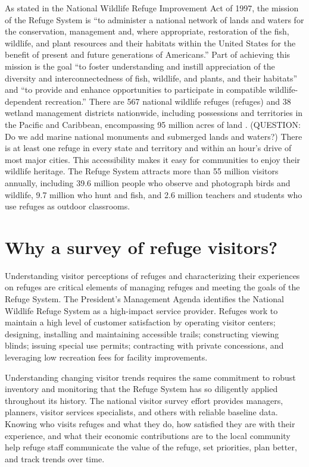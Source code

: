 \documentclass[]{book}
\begin{document}
As stated in the National Wildlife Refuge Improvement Act of 1997, the
mission of the Refuge System is ``to administer a national network of
lands and waters for the conservation, management and, where
appropriate, restoration of the fish, wildlife, and plant resources and
their habitats within the United States for the benefit of present and
future generations of Americans.'' Part of achieving this mission is the
goal ``to foster understanding and instill appreciation of the diversity
and interconnectedness of fish, wildlife, and plants, and their
habitats'' and ``to provide and enhance opportunities to participate in
compatible wildlife-dependent recreation.'' There are 567 national
wildlife refuges (refuges) and 38 wetland management districts
nationwide, including possessions and territories in the Pacific and
Caribbean, encompassing 95 million acres of land \citep{USFWS2018}.
(QUESTION: Do we add marine national monuments and submerged lands and
waters?) There is at least one refuge in every state and territory and
within an hour's drive of most major cities. This accessibility makes it
easy for communities to enjoy their wildlife heritage. The Refuge System
attracts more than 55 million visitors annually, including 39.6 million
people who observe and photograph birds and wildlife, 9.7 million who
hunt and fish, and 2.6 million teachers and students who use refuges as
outdoor classrooms.

\section*{Why a survey of refuge
visitors?}\label{why-a-survey-of-refuge-visitors}

Understanding visitor perceptions of refuges and characterizing their
experiences on refuges are critical elements of managing refuges and
meeting the goals of the Refuge System. The President's Management
Agenda identifies the National Wildlife Refuge System as a high-impact
service provider. Refuges work to maintain a high level of customer
satisfaction by operating visitor centers; designing, installing and
maintaining accessible trails; constructing viewing blinds; issuing
special use permits; contracting with private concessions, and
leveraging low recreation fees for facility improvements.

Understanding changing visitor trends requires the same commitment to
robust inventory and monitoring that the Refuge System has so diligently
applied throughout its history. The national visitor survey effort
provides managers, planners, visitor services specialists, and others
with reliable baseline data. Knowing who visits refuges and what they
do, how satisfied they are with their experience, and what their
economic contributions are to the local community help refuge staff
communicate the value of the refuge, set priorities, plan better, and
track trends over time.
\end{document}
